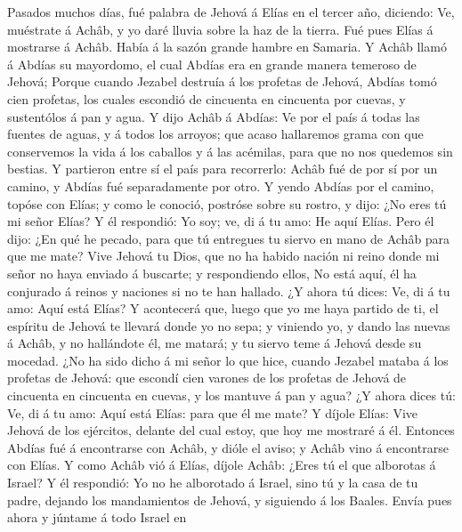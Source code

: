  Pasados muchos días, fué palabra de Jehová á Elías en el
tercer año, diciendo: Ve, muéstrate á Achâb, y yo daré lluvia sobre la
haz de la tierra.  Fué pues Elías á mostrarse á Achâb.
Había á la sazón grande hambre en Samaria.  Y Achâb llamó
á Abdías su mayordomo, el cual Abdías era en grande manera temeroso de
Jehová;  Porque cuando Jezabel destruía á los profetas de
Jehová, Abdías tomó cien profetas, los cuales escondió de cincuenta en
cincuenta por cuevas, y sustentólos á pan y agua.  Y dijo
Achâb á Abdías: Ve por el país á todas las fuentes de aguas, y á todos
los arroyos; que acaso hallaremos grama con que conservemos la vida á
los caballos y á las acémilas, para que no nos quedemos sin bestias.
 Y partieron entre sí el país para recorrerlo: Achâb fué
de por sí por un camino, y Abdías fué separadamente por otro.
 Y yendo Abdías por el camino, topóse con Elías; y como le
conoció, postróse sobre su rostro, y dijo: ¿No eres tú mi señor Elías?
 Y él respondió: Yo soy; ve, di á tu amo: He aquí Elías.
 Pero él dijo: ¿En qué he pecado, para que tú entregues tu
siervo en mano de Achâb para que me mate?  Vive Jehová tu
Dios, que no ha habido nación ni reino donde mi señor no haya enviado á
buscarte; y respondiendo ellos, No está aquí, él ha conjurado á reinos y
naciones si no te han hallado.  ¿Y ahora tú dices: Ve, di
á tu amo: Aquí está Elías?  Y acontecerá que, luego que
yo me haya partido de ti, el espíritu de Jehová te llevará donde yo no
sepa; y viniendo yo, y dando las nuevas á Achâb, y no hallándote él, me
matará; y tu siervo teme á Jehová desde su mocedad.  ¿No
ha sido dicho á mi señor lo que hice, cuando Jezabel mataba á los
profetas de Jehová: que escondí cien varones de los profetas de Jehová
de cincuenta en cincuenta en cuevas, y los mantuve á pan y agua?
 ¿Y ahora dices tú: Ve, di á tu amo: Aquí está Elías:
para que él me mate?  Y díjole Elías: Vive Jehová de los
ejércitos, delante del cual estoy, que hoy me mostraré á él.
 Entonces Abdías fué á encontrarse con Achâb, y dióle el
aviso; y Achâb vino á encontrarse con Elías.  Y como
Achâb vió á Elías, díjole Achâb: ¿Eres tú el que alborotas á Israel?
 Y él respondió: Yo no he alborotado á Israel, sino tú y
la casa de tu padre, dejando los mandamientos de Jehová, y siguiendo á
los Baales.  Envía pues ahora y júntame á todo Israel en
